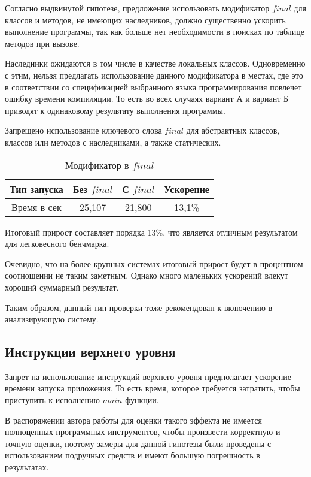 \documentclass{mipt-thesis-bs}
\begin{document}
Согласно выдвинутой гипотезе, предложение использовать модификатор
$final$ для классов и методов, не имеющих наследников, должно существенно
ускорить выполнение программы, так как больше нет необходимости в поисках
по таблице методов при вызове.

Наследники ожидаются в том числе в качестве локальных классов. Одновременно с этим,
нельзя предлагать использование данного модификатора в местах, где это в соответствии
со спецификацией выбранного языка программирования повлечет ошибку времени компиляции.
То есть во всех случаях вариант А и вариант Б приводят к одинаковому результату выполнения
программы.

Запрещено использование ключевого слова $final$ для абстрактных классов, классов или методов
с наследниками, а также статических.

\begin{table}[h]
    \centering
    \begin{tabular}{|c|c|c|c|}
      \hline
      Тип запуска & Без $final$ & С $final$ & Ускорение \\
      \hline
      Время в сек & 25,107  & 21,800 & 13,1\% \\
      \hline
    \end{tabular}
    \caption{Модификатор в $final$}
  \end{table}

Итоговый прирост составляет
порядка 13\%, что является отличным результатом для легковесного бенчмарка.

Очевидно, что на более крупных системах итоговый прирост будет в процентном соотношении не
таким заметным. Однако много маленьких ускорений влекут хороший суммарный результат.

Таким образом, данный тип проверки тоже рекомендован к включению в анализирующую систему.

\subsection{Инструкции верхнего уровня}

Запрет на использование инструкций верхнего уровня предполагает ускорение
времени запуска приложения. То есть время, которое требуется затратить, чтобы
приступить к исполнению $main$ функции.

В распоряжении автора работы для оценки такого эффекта не имеется полноценных
программных инструментов, чтобы произвести корректную и точную оценки,
поэтому замеры для данной гипотезы были проведены с использованием подручных средств
и имеют большую погрешность в результатах.
\end{document}
